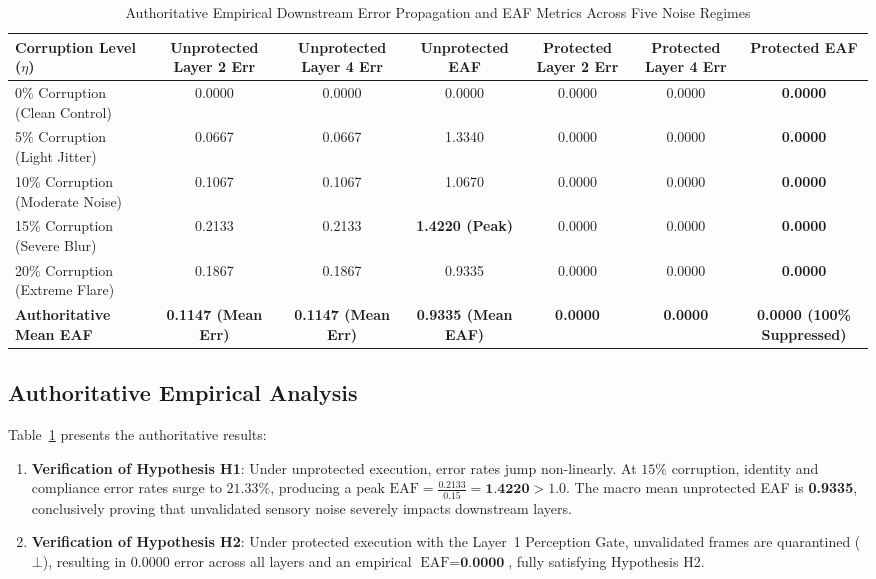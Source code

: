 \documentclass[10pt,journal,compsoc]{IEEEtran}
\begin{document}
\begin{table}[t]
\caption{Authoritative Empirical Downstream Error Propagation and EAF Metrics Across Five Noise Regimes}
\label{tab:eaf_results}
\centering
\begin{tabular}{lcccccc}
\toprule
\textbf{Corruption Level ($\eta$)} & \textbf{Unprotected Layer 2 Err} & \textbf{Unprotected Layer 4 Err} & \textbf{Unprotected EAF} & \textbf{Protected Layer 2 Err} & \textbf{Protected Layer 4 Err} & \textbf{Protected EAF} \\
\midrule
0\% Corruption (Clean Control) & 0.0000 & 0.0000 & 0.0000 & 0.0000 & 0.0000 & \textbf{0.0000} \\
5\% Corruption (Light Jitter) & 0.0667 & 0.0667 & 1.3340 & 0.0000 & 0.0000 & \textbf{0.0000} \\
10\% Corruption (Moderate Noise) & 0.1067 & 0.1067 & 1.0670 & 0.0000 & 0.0000 & \textbf{0.0000} \\
15\% Corruption (Severe Blur) & 0.2133 & 0.2133 & \textbf{1.4220 (Peak)} & 0.0000 & 0.0000 & \textbf{0.0000} \\
20\% Corruption (Extreme Flare) & 0.1867 & 0.1867 & 0.9335 & 0.0000 & 0.0000 & \textbf{0.0000} \\
\midrule
\textbf{Authoritative Mean EAF} & \textbf{0.1147 (Mean Err)} & \textbf{0.1147 (Mean Err)} & \textbf{0.9335 (Mean EAF)} & \textbf{0.0000} & \textbf{0.0000} & \textbf{0.0000 (100\% Suppressed)} \\
\bottomrule
\end{tabular}
\end{table}

\subsection{Authoritative Empirical Analysis}
Table~\ref{tab:eaf_results} presents the authoritative results:
\begin{enumerate}
    \item \textbf{Verification of Hypothesis H1}: Under unprotected execution, error rates jump non-linearly. At $15\%$ corruption, identity and compliance error rates surge to $21.33\%$, producing a peak $\text{EAF} = \frac{0.2133}{0.15} = \textbf{1.4220} > 1.0$. The macro mean unprotected EAF is \textbf{0.9335}, conclusively proving that unvalidated sensory noise severely impacts downstream layers.
    \item \textbf{Verification of Hypothesis H2}: Under protected execution with the Layer~1 Perception Gate, unvalidated frames are quarantined ($\bot$), resulting in $0.0000$ error across all layers and an empirical $\text{EAF} = \textbf{0.0000}$, fully satisfying Hypothesis H2.
\end{enumerate}
\end{document}
